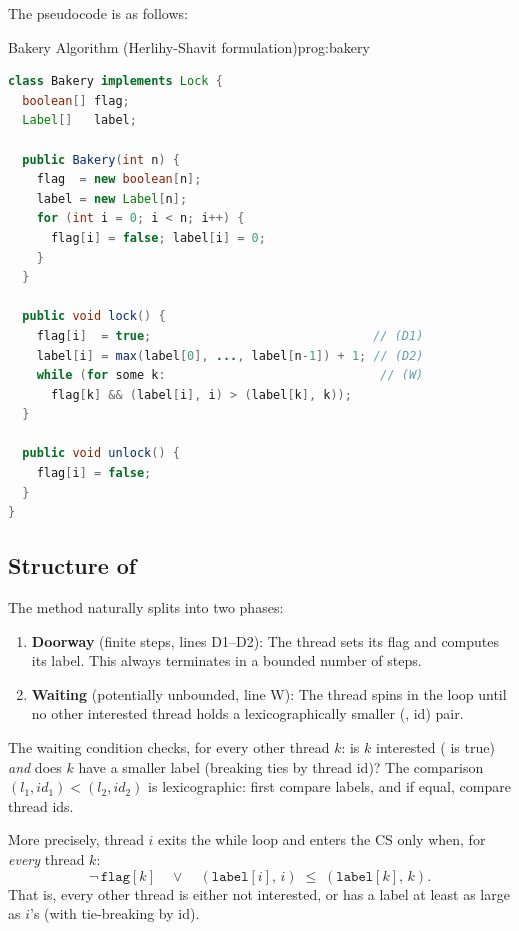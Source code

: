 The pseudocode is as follows:
\clearpage
\begin{ppprogram}{Bakery Algorithm (Herlihy-Shavit formulation)}{prog:bakery}
\begin{lstlisting}[language=Java]
class Bakery implements Lock {
  boolean[] flag;
  Label[]   label;

  public Bakery(int n) {
    flag  = new boolean[n];
    label = new Label[n];
    for (int i = 0; i < n; i++) {
      flag[i] = false; label[i] = 0;
    }
  }

  public void lock() {
    flag[i]  = true;                               // (D1)
    label[i] = max(label[0], ..., label[n-1]) + 1; // (D2)
    while (for some k:                              // (W)
      flag[k] && (label[i], i) > (label[k], k));
  }

  public void unlock() {
    flag[i] = false;
  }
}
\end{lstlisting}
\end{ppprogram}

\subsection{Structure of }

The  method naturally splits into two phases:

\begin{enumerate}[nosep]
  \item \textbf{Doorway} (finite steps, lines D1--D2): The thread sets its flag
        and computes its label. This always terminates in a bounded number of
        steps.
  \item \textbf{Waiting} (potentially unbounded, line W): The thread spins in
        the  loop until no other interested thread holds a
        lexicographically smaller (, id) pair.
\end{enumerate}

The waiting condition checks, for every other thread $k$: is $k$ interested
( is true) \emph{and} does $k$ have a smaller label (breaking
ties by thread id)? The comparison $(l_1,\mathit{id}_1) < (l_2,\mathit{id}_2)$
is lexicographic: first compare labels, and if equal, compare thread ids.

More precisely, thread $i$ exits the while loop and enters the CS only when,
for \emph{every} thread $k$:
\[
  \neg\,\texttt{flag}[k]
  \quad \lor \quad
  (\texttt{label}[i],\, i) \;\leq\; (\texttt{label}[k],\, k).
\]
That is, every other thread is either not interested, or has a label at least
as large as $i$'s (with tie-breaking by id).

